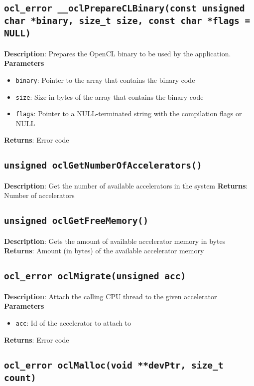 \subsection{\texttt{ocl\_error \_\_oclPrepareCLBinary(const unsigned char *binary, size\_t size, const char *flags = NULL)}}

\textbf{Description}: Prepares the OpenCL binary to be used by the application.  \\
\textbf{Parameters}
\begin{itemize}
  \item \texttt{binary}: Pointer to the array that contains the binary code
  \item \texttt{size}: Size in bytes of the array that contains the binary code
  \item \texttt{flags}: Pointer to a NULL\hyp{}terminated string with the compilation flags or 
NULL
\end{itemize}
\textbf{Returns}: Error code

\subsection{\texttt{unsigned oclGetNumberOfAccelerators()}}

\textbf{Description}: Get the number of available accelerators in the system
\textbf{Returns}: Number of accelerators

\subsection{\texttt{unsigned oclGetFreeMemory()}}

\textbf{Description}: Gets the amount of available accelerator memory in bytes
\textbf{Returns}: Amount (in bytes) of the available accelerator memory

\subsection{\texttt{ocl\_error oclMigrate(unsigned acc)}}

\textbf{Description}: Attach the calling CPU thread to the given accelerator
\textbf{Parameters}
\begin{itemize}
  \item \texttt{acc}: Id of the accelerator to attach to
\end{itemize}
\textbf{Returns}: Error code

\subsection{\texttt{ocl\_error oclMalloc(void **devPtr, size\_t count)}}

